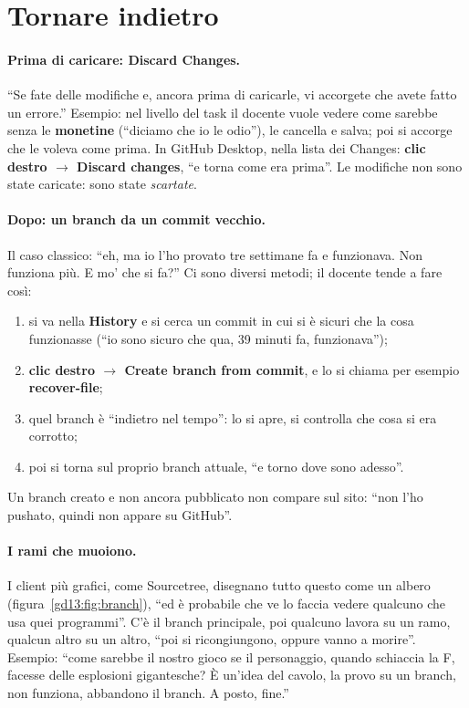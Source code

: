 \section{Tornare indietro}
\label{gd13:sec:tornare}

\paragraph{Prima di caricare: Discard Changes.} ``Se fate delle modifiche e,
ancora prima di caricarle, vi accorgete che avete fatto un errore.'' Esempio: nel
livello del task il docente vuole vedere come sarebbe senza le
\textbf{monetine} (``diciamo che io le odio''), le cancella e salva; poi si
accorge che le voleva come prima. In GitHub Desktop, nella lista dei Changes:
\textbf{clic destro $\rightarrow$ Discard changes}, ``e torna come era prima''.
Le modifiche non sono state caricate: sono state \emph{scartate}.

\paragraph{Dopo: un branch da un commit vecchio.} Il caso classico: ``eh, ma io
l'ho provato tre settimane fa e funzionava. Non funziona più. E mo' che si
fa?'' Ci sono diversi metodi; il docente tende a fare così:
\begin{enumerate}
  \item si va nella \textbf{History} e si cerca un commit in cui si è sicuri
        che la cosa funzionasse (``io sono sicuro che qua, 39 minuti fa,
        funzionava'');
  \item \textbf{clic destro $\rightarrow$ Create branch from commit}, e lo si
        chiama per esempio \textbf{recover-file};
  \item quel branch è ``indietro nel tempo'': lo si apre, si controlla che cosa
        si era corrotto;
  \item poi si torna sul proprio branch attuale, ``e torno dove sono adesso''.
\end{enumerate}
Un branch creato e non ancora pubblicato non compare sul sito: ``non l'ho
pushato, quindi non appare su GitHub''.

\paragraph{I rami che muoiono.} I client più grafici, come Sourcetree,
disegnano tutto questo come un albero (figura~\ref{gd13:fig:branch}), ``ed è
probabile che ve lo faccia vedere qualcuno che usa quei programmi''. C'è il
branch principale, poi qualcuno lavora su un ramo, qualcun altro su un altro,
``poi si ricongiungono, oppure vanno a morire''. Esempio: ``come sarebbe il
nostro gioco se il personaggio, quando schiaccia la F, facesse delle esplosioni
gigantesche? È un'idea del cavolo, la provo su un branch, non funziona,
abbandono il branch. A posto, fine.''


